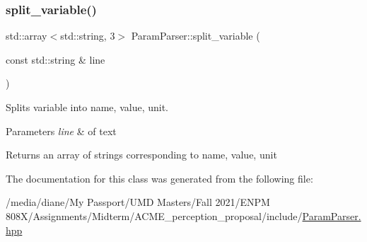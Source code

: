 \subsubsection{\texorpdfstring{split\+\_\+variable()}{split\_variable()}}
{\footnotesize\ttfamily std\+::array$<$std\+::string, 3$>$ Param\+Parser\+::split\+\_\+variable (\begin{DoxyParamCaption}\item[{const std\+::string \&}]{line }\end{DoxyParamCaption})}



Splits variable into name, value, unit. 


\begin{DoxyParams}{Parameters}
{\em line} & of text \\
\hline
\end{DoxyParams}
\begin{DoxyReturn}{Returns}
an array of strings corresponding to name, value, unit 
\end{DoxyReturn}


The documentation for this class was generated from the following file\+:\begin{DoxyCompactItemize}
\item 
/media/diane/\+My Passport/\+U\+M\+D Masters/\+Fall 2021/\+E\+N\+P\+M 808\+X/\+Assignments/\+Midterm/\+A\+C\+M\+E\+\_\+perception\+\_\+proposal/include/\hyperlink{_param_parser_8hpp}{Param\+Parser.\+hpp}\end{DoxyCompactItemize}
